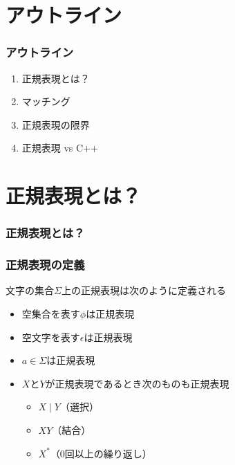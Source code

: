 \documentclass[12pt, unicode, svgnames]{beamer}
\begin{document}
\section*{アウトライン}
\begin{frame}[fragile]
  \frametitle{アウトライン}

  \begin{enumerate}
    \item<2-> 正規表現とは？
    \item<3-> マッチング
    \item<4-> 正規表現の限界
    \item<5-> 正規表現 vs C++
  \end{enumerate}
\end{frame}

\section{正規表現とは？}
\begin{frame}[fragile]
  \frametitle{正規表現とは？}

\end{frame}

\begin{frame}[fragile]
  \frametitle{正規表現の定義}

  文字の集合$\Sigma$上の正規表現は次のように定義される
  \begin{block}{}
    \begin{itemize}
      \item<2-> 空集合を表す$\phi$は正規表現
      \item<3-> 空文字を表す$\epsilon$は正規表現
      \item<4-> $a \in \Sigma$は正規表現
      \item<5-> $X$と$Y$が正規表現であるとき次のものも正規表現
        \begin{itemize}
          \item<6-> $X \mid Y$（選択）
          \item<7-> $X Y$（結合）
          \item<8-> $X^*$（0回以上の繰り返し）
        \end{itemize}
    \end{itemize}
  \end{block}
\end{frame}
\end{document}
